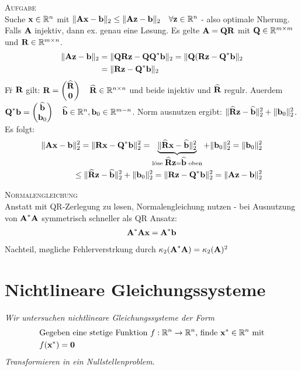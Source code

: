 \textsc{Aufgabe}\\
Suche $\mbox{\bf x} \in \mathbb{R}^{n}$ mit $\Vert \mbox{\bf Ax}-\mbox{\bf b} \Vert_2 \leq \Vert \mbox{\bf Az}-\mbox{\bf b} \Vert_2 \quad \forall \mbox{\bf z} \in \mathbb{R}^{n}$ - also optimale N\a herung. Falls $\mbox{\bf A}$ injektiv, dann ex. genau eine L\o sung. Es gelte $\mbox{\bf A}=\mbox{\bf QR}$ mit $\mbox{\bf Q} \in \mathbb{R}^{m \times m}$ und $\mbox{\bf R} \in \mathbb{R}^{m \times n}$.
\begin{align*}
\Vert \mbox{\bf Az}-\mbox{\bf b} \Vert_2 &= \Vert \mbox{\bf QRz}-\mbox{\bf QQ}^*\mbox{\bf b} \Vert_2 = \Vert \mbox{\bf Q}(\mbox{\bf Rz}-\mbox{\bf Q}^*\mbox{\bf b} \Vert_2 \\&= \Vert \mbox{\bf Rz}-\mbox{\bf Q}^*\mbox{\bf b} \Vert_2
\end{align*}
F\u r $\mbox{\bf R}$ gilt: $\mbox{\bf R} = \begin{pmatrix}
\widehat{\mbox{\bf R}} \\
\mbox{\bf 0}
\end{pmatrix} \quad \widehat{\mbox{\bf R}} \in \mathbb{R}^{n \times n}$ und beide injektiv und $\widehat{\mbox{\bf R}}$ regul\a r. Au\s erdem $\mbox{\bf Q}^*\mbox{\bf b}=\begin{pmatrix}
\widehat{\mbox{\bf b}} \\ \mbox{\bf b}_0
\end{pmatrix} \quad \widehat{\mbox{\bf b}}\in \mathbb{R}^{n}, \mbox{\bf b}_0 \in \mathbb{R}^{m-n}$. Norm ausnutzen ergibt: $\Vert \widehat{\mbox{\bf R}}\mbox{\bf z}-\widehat{\mbox{\bf b}}\Vert_2^2 + \Vert \mbox{\bf b}_0 \Vert_2^2$. Es folgt:
\begin{align*}
\Vert \mbox{\bf Ax}-\mbox{\bf b}\Vert_2^2 = \Vert \mbox{\bf Rx}-\mbox{\bf Q}^*\mbox{\bf b}\Vert_2^2 = \underbrace{\Vert \widehat{\mbox{\bf R}}\mbox{\bf x}-\widehat{\mbox{\bf b}}\Vert_2^2}_{\text{l\"{o}se } \widehat{\mbox{\bf R}}\mbox{\bf z}=\widehat{\mbox{\bf b}} \text{ oben}} + \Vert \mbox{\bf b}_0 \Vert_2^2 =  \Vert \mbox{\bf b}_0 \Vert_2^2 \\ 
\leq \Vert \widehat{\mbox{\bf R}}\mbox{\bf z}-\widehat{\mbox{\bf b}}\Vert_2^2 + \Vert \mbox{\bf b}_0 \Vert_2^2 = \Vert \mbox{\bf Rz}-\mbox{\bf Q}^*\mbox{\bf b} \Vert_2^2 = \Vert \mbox{\bf Az}-\mbox{\bf b} \Vert_2^2
\end{align*}

\textsc{Normalengleichung}\\
Anstatt mit QR-Zerlegung zu l\o sen, Normalengleichung nutzen - bei Ausnutzung von $\mbox{\bf A}^*\mbox{\bf A}$ symmetrisch schneller als QR Ansatz:
\begin{align*}
\mbox{\bf A}^*\mbox{\bf Ax} = \mbox{\bf A}^*\mbox{\bf b}
\end{align*}
Nachteil, m\o gliche Fehlerverst\a rkung durch $\kappa_2(\mbox{\bf A}^*\mbox{\bf A})=\kappa_2(\mbox{\bf A})^2$

\section{Nichtlineare Gleichungssysteme}
\emph{Wir untersuchen nichtlineare Gleichungssysteme der Form}
\begin{align*}
&\text{Gegeben eine stetige Funktion $f:\mathbb{R}^{n} \rightarrow \mathbb{R}^{n}$, finde $\mbox{\bf x}^* \in \mathbb{R}^{n}$ mit} \\
&f(\mbox{\bf x}^*) = \mbox{\bf 0}
\end{align*}
\emph{Transformieren in ein Nullstellenproblem}.
